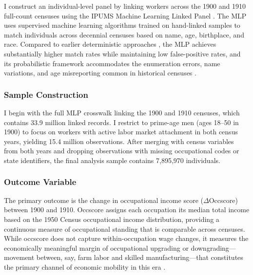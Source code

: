 \documentclass[12pt]{article}
\begin{document}
I construct an individual-level panel by linking workers across the 1900 and 1910 full-count censuses using the IPUMS Machine Learning Linked Panel \citep[MLP;][]{brueckner2011mlp, ruggles2021ipums}. The MLP uses supervised machine learning algorithms trained on hand-linked samples to match individuals across decennial censuses based on name, age, birthplace, and race. Compared to earlier deterministic approaches \citep{ferrie1996new}, the MLP achieves substantially higher match rates while maintaining low false-positive rates, and its probabilistic framework accommodates the enumeration errors, name variations, and age misreporting common in historical censuses \citep{abramitzky2021automated}.

\subsubsection*{Sample Construction} I begin with the full MLP crosswalk linking the 1900 and 1910 censuses, which contains 33.9 million linked records. I restrict to prime-age men (ages 18--50 in 1900) to focus on workers with active labor market attachment in both census years, yielding 15.4 million observations. After merging with census variables from both years and dropping observations with missing occupational codes or state identifiers, the final analysis sample contains 7,895,970 individuals.

\subsubsection*{Outcome Variable} The primary outcome is the change in occupational income score ($\Delta$Occscore) between 1900 and 1910. Occscore assigns each occupation its median total income based on the 1950 Census occupational income distribution, providing a continuous measure of occupational standing that is comparable across censuses. While occscore does not capture within-occupation wage changes, it measures the economically meaningful margin of occupational upgrading or downgrading---movement between, say, farm labor and skilled manufacturing---that constitutes the primary channel of economic mobility in this era \citep{long2013intergenerational, goldin2007long}.
\end{document}
